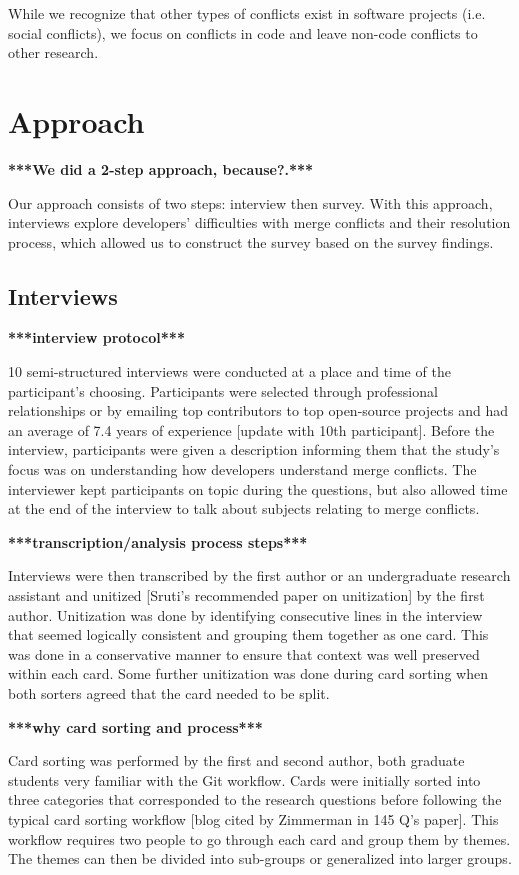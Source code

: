 \documentclass[conference]{IEEEtran}
\begin{document}
While we recognize that other types of conflicts exist in software projects (i.e. social conflicts), we focus on conflicts in code and leave non-code conflicts to other research.

\section{Approach}
\textbf{***We did a 2-step approach, because?.***}

Our approach consists of two steps: interview then survey. With this approach, interviews explore developers' difficulties with merge conflicts and their resolution process, which allowed us to construct the survey based on the survey findings.

\subsection{Interviews}
\textbf{***interview protocol***}

10 semi-structured interviews were conducted at a place and time of the participant's choosing. Participants were selected through professional relationships or by emailing top contributors to top open-source projects and had an average of 7.4 years of experience [update with 10th participant]. Before the interview, participants were given a description informing them that the study's focus was on understanding how developers understand merge conflicts. The interviewer kept participants on topic during the questions, but also allowed time at the end of the interview to talk about subjects relating to merge conflicts. 

\textbf{***transcription/analysis process steps***}

Interviews were then transcribed by the first author or an undergraduate research assistant and unitized [Sruti's recommended paper on unitization] by the first author. Unitization was done by identifying consecutive lines in the interview that seemed logically consistent and grouping them together as one card. This was done in a conservative manner to ensure that context was well preserved within each card. Some further unitization was done during card sorting when both sorters agreed that the card needed to be split.

\textbf{***why card sorting and process***}

Card sorting was performed by the first and second author, both graduate students very familiar with the Git workflow. Cards were initially sorted into three categories that corresponded to the research questions before following the typical card sorting workflow [blog cited by Zimmerman in 145 Q's paper]. This workflow requires two people to go through each card and group them by themes. The themes can then be divided into sub-groups or generalized into larger groups.
\end{document}

